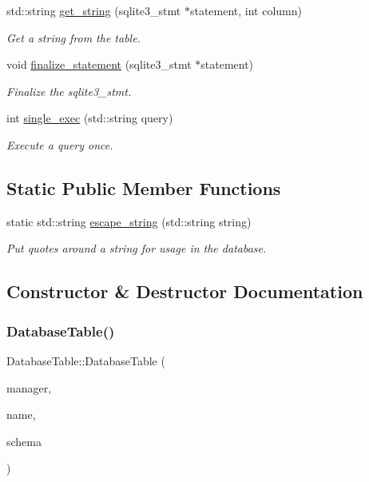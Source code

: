 \begin{DoxyCompactItemize}
std\+::string \hyperlink{class_database_table_af40064f4da53b2e99aca18c908655d46}{get\+\_\+string} (sqlite3\+\_\+stmt $\ast$statement, int column)
\begin{DoxyCompactList}\small\item\em Get a string from the table. \end{DoxyCompactList}\item 
void \hyperlink{class_database_table_a05ee171b68bcbfc11583abb15dfd4b5b}{finalize\+\_\+statement} (sqlite3\+\_\+stmt $\ast$statement)
\begin{DoxyCompactList}\small\item\em Finalize the sqlite3\+\_\+stmt. \end{DoxyCompactList}\item 
int \hyperlink{class_database_table_aa6a3790e2f842bcf9b05a762b39f0645}{single\+\_\+exec} (std\+::string query)
\begin{DoxyCompactList}\small\item\em Execute a query once. \end{DoxyCompactList}\end{DoxyCompactItemize}
\subsection*{Static Public Member Functions}
\begin{DoxyCompactItemize}
\item 
static std\+::string \hyperlink{class_database_table_ae01bd415842c6f6223a35f2ff135f625}{escape\+\_\+string} (std\+::string string)
\begin{DoxyCompactList}\small\item\em Put quotes around a string for usage in the database. \end{DoxyCompactList}\end{DoxyCompactItemize}


\subsection{Constructor \& Destructor Documentation}
\mbox{\label{class_database_table_a6b1dcd25d72f28fc57168ac53b6d9a97}} 
\subsubsection{\texorpdfstring{Database\+Table()}{DatabaseTable()}}
{\footnotesize\ttfamily Database\+Table\+::\+Database\+Table (\begin{DoxyParamCaption}\item[{\hyperlink{class_database_manager}{Database\+Manager} $\ast$}]{manager,  }\item[{std\+::string}]{name,  }\item[{std\+::string}]{schema }\end{DoxyParamCaption})}



